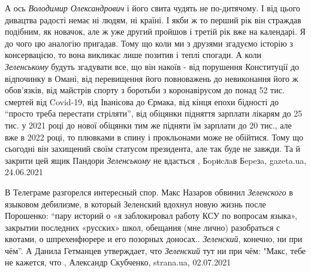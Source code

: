 А ось \emph{Володимир Олександрович} і його свита чудять не по-дитячому. І від цього
дивацтва радості немає ні людям, ні країні. І якби ж то перший рік він страждав
подібним, як новачок, але ж уже другий пройшов і третій рік вже на календарі. Я
до чого цю аналогію пригадав. Тому що коли ми з друзями згадуємо історію з
консервацією, то вона викликає лише позитив і теплі спогади. А коли \emph{Зеленському}
будуть згадувати все, що він накоїв - від порушення Конституції до відпочинку в
Омані, від перевищення його повноважень до невиконання його ж обов'язків, від
майстрів спорту з боротьби з коронавірусом до понад 52 тис. смертей від
Covid-19, від Іванісова до Єрмака, від кінця епохи бідності до \enquote{просто треба
перестати стріляти}, від обіцянки підняття зарплати лікарям до 25 тис. у 2021
році до нової обіцянки тим же підняти їм зарплати до 20 тис., але вже в 2022
році, то плювками в спину і прокльонами може не обійтися. Тому що сьогодні він
захищений своїм статусом президента, але так буде не завжди. Та й закрити цей
ящик Пандори \emph{Зеленському} не вдасться
, 
Бopиcлaв Бepeзa, gazeta.ua, 24.06.2021

В Телеграме разгорелся интересный спор.
Макс Назаров обвинил \emph{Зеленского} в языковом дебилизме, в который Зеленский
вдохнул новую жизнь после Порошенко: \enquote{пару историй о «я заблокировал работу КСУ
по вопросам языка», закрытии последних «русских» школ, обещания (мне лично)
разобраться с квотами, о шпрехенфюрере и его позорных доносах.. \emph{Зеленский},
конечно, ни при чём}.
А Данила Гетманцев утверждает, что \emph{Зеленский} тут ни при чём: "Макс, тебе не
кажется, что
, 
Александр Скубченко, strana.ua, 02.07.2021

